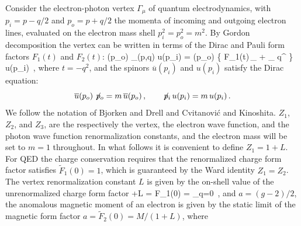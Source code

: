 Consider the electron-photon vertex $\Gamma_{\mu}$ of quantum
electrodynamics, with $p_{i}=p-q/2$ and $p_{o}=p+q/2$ the momenta of
incoming and outgoing electron lines, evaluated on the electron mass
shell $p_{i}^2=p_{o}^2=m^2$.
By Gordon decomposition the vertex can be written in terms of the Dirac
and Pauli form factors $F_1(t)$ and $F_2(t)$:
\beq
{}(p_{o}) \Gamma_{\mu}(p,q) %
u(p_{i})
    =    %
(p_{o}) \Bigg\{ F_1(t)\,\gamma_{\mu}
                           +  \; \sigma_{\mu \nu} q^{\nu}
                    \Bigg\} u(p_{i}) \,,
\label{BAGTB17(35-1)}
\eeq
where
$t=-q^2$, and
the spinors  $\overline{u}(p_{i})$ and $u(p_{i})$  satisfy the Dirac
equation:
\[
\overline{u}(p_{o}) \not\!{p}_{o} = m \, \overline{u}(p_{o})
\,, \qquad
\not\!{p}_{i} \, u(p_{i})  =  m \, u(p_{i}) \,.
\]
We follow the notation of Bjorken and Drell
and Cvitanovi{\'c} and Kinoshita.
$Z_1$,
$Z_2$, and %
$Z_3$,
are the respectively the vertex,
the electron wave function, and
the photon wave function
renormalization constants,
and the electron mass will be set to $m = 1$ throughout.
In what follows it is convenient to define $Z_1=1+L$.
For QED the charge conservation requires that the renormalized charge
form factor satisfies $\tilde{F}_1(0) = 1$, which is guaranteed by the
Ward identity
$Z_1=Z_2$.
The vertex renormalization constant $L$ is given by the
on-shell value of the unrenormalized charge form factor
+L = F_1(0)
    = \tr{}_{q=0}
\label{PRD10-74-III(2.3)}
\,,
\eeq
and  $a = (g-2)/2$, the anomalous magnetic moment of an electron is
given by the static limit of the magnetic form factor
$a=\tilde{F}_2(0)=M/(1+L)$, where
